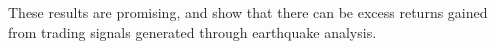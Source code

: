 These results are promising, and show that there can be excess returns gained from trading signals generated through earthquake analysis.




